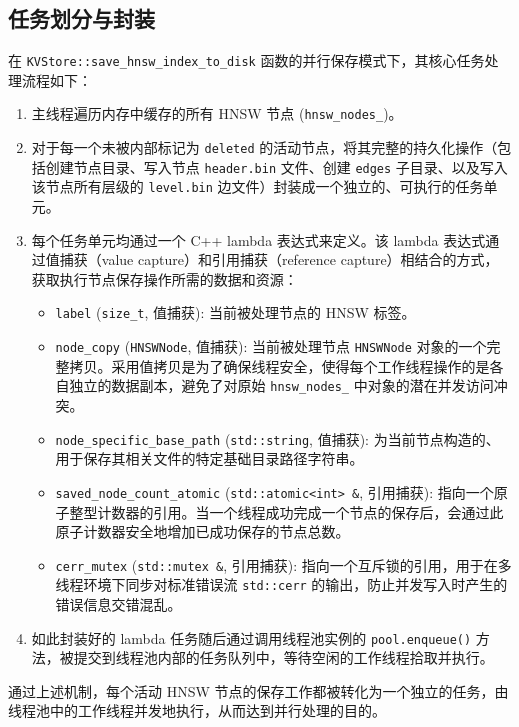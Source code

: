 \documentclass{ctexart} %
\begin{document}
\subsection{任务划分与封装}
在 \texttt{KVStore::save_hnsw_index_to_disk} 函数的并行保存模式下，其核心任务处理流程如下：
\begin{enumerate}
    \item 主线程遍历内存中缓存的所有 HNSW 节点 (\texttt{hnsw_nodes_})。
    \item 对于每一个未被内部标记为 \texttt{deleted} 的活动节点，将其完整的持久化操作（包括创建节点目录、写入节点 \texttt{header.bin} 文件、创建 \texttt{edges} 子目录、以及写入该节点所有层级的 \texttt{level.bin} 边文件）封装成一个独立的、可执行的任务单元。
    \item 每个任务单元均通过一个 C++ lambda 表达式来定义。该 lambda 表达式通过值捕获（value capture）和引用捕获（reference capture）相结合的方式，获取执行节点保存操作所需的数据和资源：
    \begin{itemize}
        \item \texttt{label} (\texttt{size_t}, 值捕获): 当前被处理节点的 HNSW 标签。
        \item \texttt{node\_copy} (\texttt{HNSWNode}, 值捕获): 当前被处理节点 \texttt{HNSWNode} 对象的一个完整拷贝。采用值拷贝是为了确保线程安全，使得每个工作线程操作的是各自独立的数据副本，避免了对原始 \texttt{hnsw_nodes_} 中对象的潜在并发访问冲突。
        \item \texttt{node\_specific\_base\_path} (\texttt{std::string}, 值捕获): 为当前节点构造的、用于保存其相关文件的特定基础目录路径字符串。
        \item \texttt{saved\_node\_count\_atomic} (\texttt{std::atomic<int> &}, 引用捕获): 指向一个原子整型计数器的引用。当一个线程成功完成一个节点的保存后，会通过此原子计数器安全地增加已成功保存的节点总数。
        \item \texttt{cerr\_mutex} (\texttt{std::mutex &}, 引用捕获): 指向一个互斥锁的引用，用于在多线程环境下同步对标准错误流 \texttt{std::cerr} 的输出，防止并发写入时产生的错误信息交错混乱。
    \end{itemize}
    \item 如此封装好的 lambda 任务随后通过调用线程池实例的 \texttt{pool.enqueue()} 方法，被提交到线程池内部的任务队列中，等待空闲的工作线程拾取并执行。
\end{enumerate}
通过上述机制，每个活动 HNSW 节点的保存工作都被转化为一个独立的任务，由线程池中的工作线程并发地执行，从而达到并行处理的目的。
\end{document}
